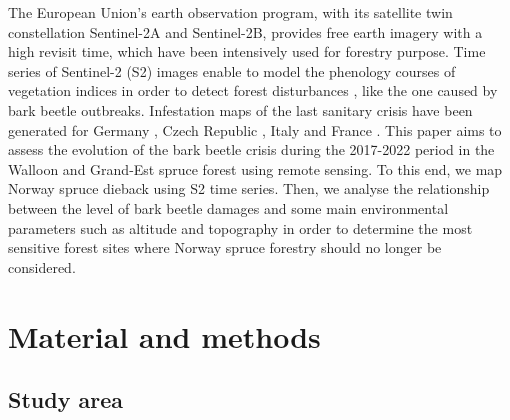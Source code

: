 \documentclass[3p,procedia]{elsarticle}
\begin{document}
The European Union’s earth observation program, with its satellite twin constellation Sentinel-2A and Sentinel-2B, provides free earth imagery with a high revisit time, which have been intensively used for forestry purpose. 
Time series of Sentinel-2 (S2) images enable to model the phenology courses of vegetation indices in order to detect forest disturbances \citep{low_phenology_2020}, like the one caused by bark beetle outbreaks.
Infestation maps of the last sanitary crisis have been generated for Germany \citep{ali_canopy_2021,thonfeld_first_2022}, Czech Republic \citep{barta_early_2021}, Italy \citep{dalponte_mapping_2022} and France \citep{nardi_drought_2022}. 
This paper aims to assess the evolution of the bark beetle crisis during the 2017-2022 period in the Walloon and Grand-Est spruce forest using remote sensing.
To this end, we map Norway spruce dieback using S2 time series.
Then, we analyse the relationship between the level of bark beetle damages and some main environmental parameters such as altitude and topography in order to determine the most sensitive forest sites where Norway spruce forestry should no longer be considered.

\section{Material and methods}
\subsection{Study area}
\end{document}
